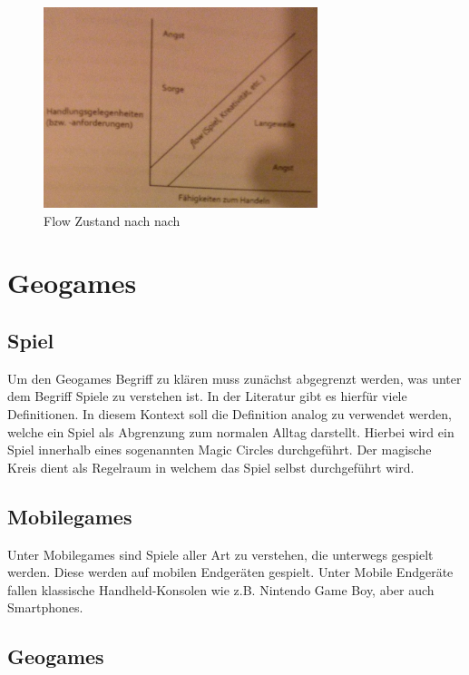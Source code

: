 \begin{figure}[H]
\begin{center}
\includegraphics[width=80mm]{images/ch03_img02_flow.jpg}
\caption{Flow Zustand nach  nach \cite{Csikszentmihalyi.1991}}
\label{img:ch03_img02_flow}
\end{center}
\end{figure}

\section{Geogames}
\label{subsec:S3_Geogames}

\subsection*{Spiel}

Um den Geogames Begriff zu klären muss zunächst abgegrenzt werden, was unter dem Begriff Spiele zu verstehen ist. In der Literatur gibt es hierfür viele Definitionen.
In diesem Kontext soll die Definition analog zu \cite{Salen.2010} verwendet werden, welche ein Spiel als Abgrenzung zum normalen Alltag darstellt. Hierbei wird ein Spiel innerhalb eines sogenannten Magic Circles durchgeführt.
Der magische Kreis dient als Regelraum in welchem das Spiel selbst durchgeführt wird.


\subsection*{Mobilegames}

Unter Mobilegames sind Spiele aller Art zu verstehen, die unterwegs gespielt werden. Diese werden auf mobilen Endgeräten gespielt. \cite{Bell.2006} Unter Mobile Endgeräte fallen klassische Handheld-Konsolen wie z.B. Nintendo Game Boy, aber auch Smartphones.

\subsection*{Geogames}

